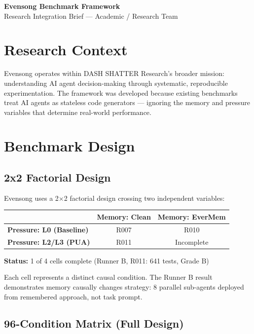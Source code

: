 \documentclass[11pt,a4paper]{article}
\begin{document}
\begin{center}
{\fontsize{22pt}{28pt}\selectfont\sffamily\bfseries\color{deep}Evensong Benchmark Framework}\\
{\fontsize{11pt}{14pt}\selectfont\sffamily\color{gray}Research Integration Brief — Academic / Research Team}
\end{center}
\vspace{2mm}{\color{deep}\rule{\textwidth}{0.5pt}}\vspace{2mm}

\section{Research Context}

Evensong operates within DASH SHATTER Research's broader mission: understanding AI agent decision-making through systematic, reproducible experimentation. The framework was developed because existing benchmarks treat AI agents as stateless code generators — ignoring the memory and pressure variables that determine real-world performance.

\section{Benchmark Design}

\subsection{2x2 Factorial Design}

Evensong uses a 2$\times$2 factorial design crossing two independent variables:

\begin{tabular}{l|c|c}
  & \textbf{Memory: Clean} & \textbf{Memory: EverMem} \\\hline
  \textbf{Pressure: L0 (Baseline)} & R007 & R010 \\
  \textbf{Pressure: L2/L3 (PUA)} & R011 & Incomplete
\end{tabular}

\textbf{Status:} 1 of 4 cells complete (Runner B, R011: 641 tests, Grade B)

Each cell represents a distinct causal condition. The Runner B result demonstrates memory causally changes strategy: 8 parallel sub-agents deployed from remembered approach, not task prompt.

\subsection{96-Condition Matrix (Full Design)}
\end{document}

